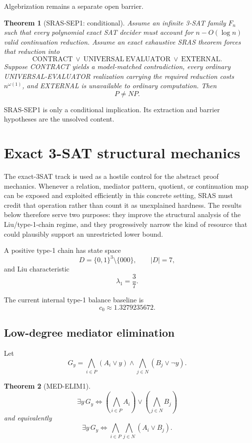 \documentclass[11pt]{article}
\theoremstyle{plain}
\newtheorem{theorem}{Theorem}[section]
\theoremstyle{definition}
\theoremstyle{remark}
\begin{document}
Algebrization remains a separate open barrier.

\begin{theorem}[SRAS-SEP1: conditional]
Assume an infinite 3-SAT family $F_n$ such that every polynomial exact SAT
decider must account for $n-O(\log n)$ valid continuation reduction. Assume an
exact exhaustive SRAS theorem forces that reduction into
\[
\mathrm{CONTRACT}\ \vee\
\mathrm{UNIVERSAL\ EVALUATOR}\ \vee\
\mathrm{EXTERNAL}.
\]
Suppose CONTRACT yields a model-matched contradiction, every ordinary
UNIVERSAL-EVALUATOR realization carrying the required reduction costs
$n^{\omega(1)}$, and EXTERNAL is unavailable to ordinary computation. Then
\[
\boxed{P\ne NP.}
\]
\end{theorem}

\begin{warningbox}
SRAS-SEP1 is only a conditional implication. Its extraction and barrier
hypotheses are the unsolved content.
\end{warningbox}

\section{Exact 3-SAT structural mechanics}

The exact-3SAT track is used as a hostile control for the abstract proof
mechanics. Whenever a relation, mediator pattern, quotient, or continuation
map can be exposed and exploited efficiently in this concrete setting, SRAS
must credit that operation rather than count it as unexplained hardness. The
results below therefore serve two purposes: they improve the structural
analysis of the Liu/type-1-chain regime, and they progressively narrow the
kind of resource that could plausibly support an unrestricted lower bound.

A positive type-1 chain has state space
\[
D=\{0,1\}^3\setminus\{000\},
\qquad |D|=7,
\]
and Liu characteristic
\[
\boxed{\lambda_1=\frac37.}
\]

The current internal type-1 balance baseline is
\[
\boxed{c_0\approx1.3279235672.}
\]

\subsection{Low-degree mediator elimination}

Let
\[
G_y=
\bigwedge_{i\in P}(A_i\vee y)
\wedge
\bigwedge_{j\in N}(B_j\vee\neg y).
\]

\begin{theorem}[MED-ELIM1]
\[
\boxed{
\exists y\,G_y
\iff
\left(\bigwedge_{i\in P}A_i\right)
\vee
\left(\bigwedge_{j\in N}B_j\right)
}
\]
and equivalently
\[
\boxed{
\exists y\,G_y
\iff
\bigwedge_{i\in P}\bigwedge_{j\in N}(A_i\vee B_j).
}
\]
\end{theorem}
\end{document}

